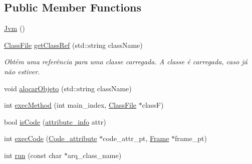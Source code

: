 \subsection*{Public Member Functions}
\begin{DoxyCompactItemize}
\item 
\hyperlink{classJvm_a2bbdf6ed1c101825a440bd38dfa54a5a}{Jvm} ()
\item 
\hyperlink{classClassFile}{Class\+File} \hyperlink{classJvm_a476c06c87fd095094de0978b8f70228f}{get\+Class\+Ref} (std\+::string class\+Name)
\begin{DoxyCompactList}\small\item\em Obtém uma referência para uma classe carregada. A classe é carregada, caso já não estiver. \end{DoxyCompactList}\item 
void \hyperlink{classJvm_aa2b02b00822755f177cfcaabdb26d793}{alocar\+Objeto} (std\+::string class\+Name)
\item 
int \hyperlink{classJvm_a4efbdc04a403a81c7cd904422a4d1cf2}{exec\+Method} (int main\+\_\+index, \hyperlink{classClassFile}{Class\+File} $\ast$class\+F)
\item 
bool \hyperlink{classJvm_a160a1f1832069aa5e9e6aba0359f32db}{is\+Code} (\hyperlink{attributes_8hpp_a7af51299ff517acce960ac87c9db9899}{attribute\+\_\+info} attr)
\item 
int \hyperlink{classJvm_aa837238f1eb0f4ce3efc83ff4f928908}{exec\+Code} (\hyperlink{attributes_8hpp_ad1d2692bc09d9023430faad186e7647e}{Code\+\_\+attribute} $\ast$code\+\_\+attr\+\_\+pt, \hyperlink{classFrame}{Frame} $\ast$frame\+\_\+pt)
\item 
int \hyperlink{classJvm_ac7b36cf9d42be5f4e9fbd1e49f4565d3}{run} (const char $\ast$arq\+\_\+class\+\_\+name)
\end{DoxyCompactItemize}
